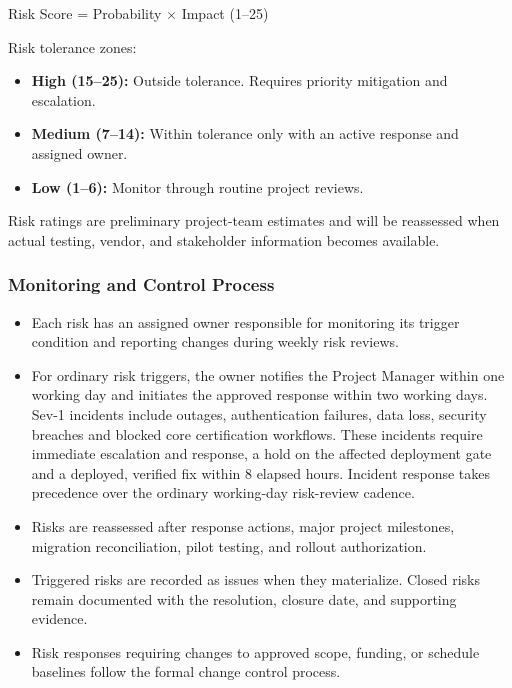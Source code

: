 Risk Score = Probability \(\times\) Impact (1--25)


Risk tolerance zones:


\begin{itemize}
\item \textbf{High (15--25):} Outside tolerance. Requires priority mitigation and escalation.
\item \textbf{Medium (7--14):} Within tolerance only with an active response and assigned owner.
\item \textbf{Low (1--6):} Monitor through routine project reviews.
\end{itemize}


Risk ratings are preliminary project-team estimates and will be reassessed when actual testing, vendor, and stakeholder information becomes available.


\subsubsection{Monitoring and Control Process}\label{sec:monitoring-and-control-process}
\begin{itemize}
\item Each risk has an assigned owner responsible for monitoring its trigger condition and reporting changes during weekly risk reviews.
\item For ordinary risk triggers, the owner notifies the Project Manager within one working day and initiates the approved response within two working days. Sev-1 incidents include outages, authentication failures, data loss, security breaches and blocked core certification workflows. These incidents require immediate escalation and response, a hold on the affected deployment gate and a deployed, verified fix within 8 elapsed hours. Incident response takes precedence over the ordinary working-day risk-review cadence.
\item Risks are reassessed after response actions, major project milestones, migration reconciliation, pilot testing, and rollout authorization.
\item Triggered risks are recorded as issues when they materialize. Closed risks remain documented with the resolution, closure date, and supporting evidence.
\item Risk responses requiring changes to approved scope, funding, or schedule baselines follow the formal change control process.
\end{itemize}


